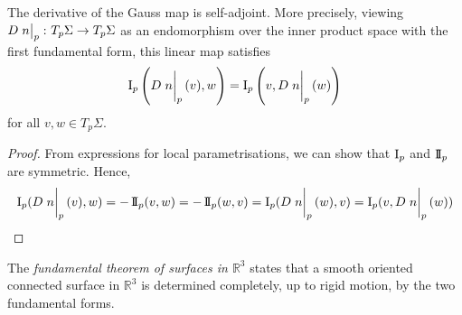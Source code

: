 \begin{lemma}
	The derivative of the Gauss map is self-adjoint.
	More precisely, viewing \( D \eval{n}_p \colon T_p \Sigma \to T_p \Sigma \) as an endomorphism over the inner product space with the first fundamental form, this linear map satisfies
	\[
		\Iff_p\qty(D \eval{n}_p(v), w) = \Iff_p\qty(v, D \eval{n}_p(w))
	\]
	for all \( v, w \in T_p \Sigma \).
\end{lemma}
\begin{proof}
	From expressions for local parametrisations, we can show that \( \operatorname{\mathrm{I}}_p \) and \( \operatorname{\mathrm{I\!I}}_p \) are symmetric.
	Hence,
	\[
		\Iff_p(D\eval{n}_p(v),w) = -\IIff_p(v,w) = -\IIff_p(w,v) = \Iff_p(D \eval{n}_p(w),v) = \Iff_p(v,D\eval{n}_p(w))
	\]
\end{proof}
\begin{remark}
	The \textit{fundamental theorem of surfaces in \( \mathbb R^3 \)} states that a smooth oriented connected surface in \( \mathbb R^3 \) is determined completely, up to rigid motion, by the two fundamental forms.
\end{remark}

